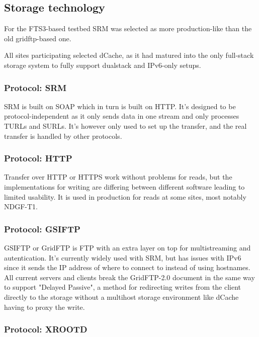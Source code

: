 \subsection{Storage technology}

For the FTS3-based testbed SRM \cite{SRM2.2} was selected as more production-like 
than the old gridftp-based one. 

All sites participating selected dCache, as it had matured into the only full-stack storage 
system to fully support dualstack and IPv6-only setups.

\subsubsection{Protocol: SRM}

SRM is built on SOAP which in turn is built on HTTP. It's designed to be protocol-independent as it only sends data in one stream and only processes TURLs and SURLs.
It's however only used to set up the transfer, and the real transfer is handled by other protocols.

\subsubsection{Protocol: HTTP}

Transfer over HTTP or HTTPS work without problems for reads, but the implementations for writing are differing between different software leading to limited usability.
It is used in production for reads at some sites, most notably NDGF-T1.

\subsubsection{Protocol: GSIFTP} 

GSIFTP or GridFTP\cite{GFTP1.0} is FTP with an extra layer on top for multistreaming and autentication. It's currently widely used with SRM, but has issues with IPv6 since it sends the IP address of where to
connect to instead of using hostnames. All current servers and clients break the GridFTP-2.0 document \cite{GFTP2.0} in the same way to support "Delayed Passive", a method for redirecting writes from the client directly to the storage without a multihost storage environment like dCache having to proxy the write. 


\subsubsection{Protocol: XROOTD} 

